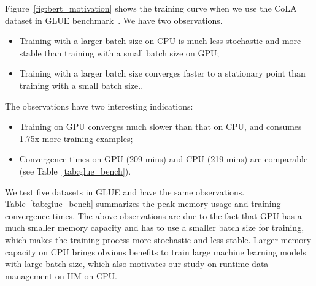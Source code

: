\textcolor{check}{
Figure~\ref{fig:bert_motivation} shows the training curve when we use the CoLA dataset in GLUE benchmark~\cite{wang-etal-2018-glue}. We have two observations.}

\begin{itemize} %
    \item \textcolor{dong}{Training with a larger batch size on CPU is much less stochastic and more stable than training with a small batch size on GPU;}
    \item \textcolor{check}{Training with a larger batch size converges faster to a stationary point than training with a small batch size.}. 
\end{itemize}

\textcolor{check}{
The observations have two interesting indications: }
\begin{itemize} %
    \item \textcolor{check}{Training on GPU converges much slower than that on CPU, and consumes 1.75x more training examples;}
    \item \textcolor{check}{Convergence times on GPU (209 mins) and CPU (219 mins) are comparable (see Table~\ref{tab:glue_bench})}. 
\end{itemize}

\textcolor{check}{
We test five datasets in GLUE and have the same observations. Table~\ref{tab:glue_bench} summarizes the peak memory usage and training convergence times. The above observations are due to the fact that GPU has a much smaller memory capacity and has to use a smaller batch size for training, which makes the training process more stochastic and less stable. Larger memory capacity on CPU brings obvious benefits to train large machine learning models with large batch size, which also motivates our study on runtime data management on HM on CPU}.


